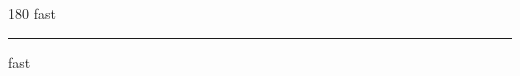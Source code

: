 
\begin{frame}
\begin{center}
\begin{turn}{180}
{\fontsize{2.5cm}{1em}\selectfont fast}
\end{turn}
\vspace{1em}\par  
\hrule
\vspace{1em}\par  
{\fontsize{2.5cm}{1em}\selectfont fast}
\end{center}
\end{frame}
